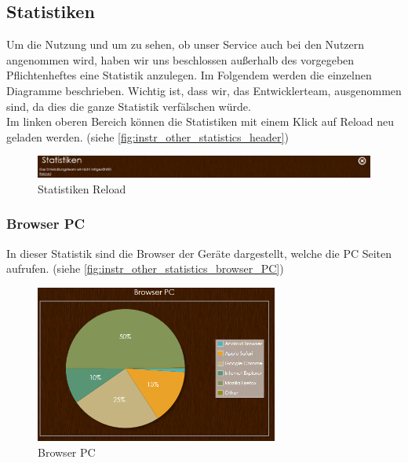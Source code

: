 \subsection{Statistiken}
Um die Nutzung und um zu sehen, ob unser Service auch bei den Nutzern angenommen wird, haben wir uns beschlossen außerhalb des vorgegeben Pflichtenheftes eine Statistik anzulegen. Im Folgendem werden die einzelnen Diagramme beschrieben. Wichtig ist, dass wir, das Entwicklerteam, ausgenommen sind, da dies die ganze Statistik verfälschen würde.\\
Im linken oberen Bereich können die Statistiken mit einem Klick auf Reload neu geladen werden. (siehe \autoref{fig:instr_other_statistics_header})
\begin{figure}[H]
\centering
\includegraphics[keepaspectratio=true, width=17cm]{images/screenshots/statistics_header.png}
\caption{Statistiken Reload}
\label{fig:instr_other_statistics_header}
\end{figure}
\subsubsection{Browser PC}
In dieser Statistik sind die Browser der Geräte dargestellt, welche die PC Seiten aufrufen. (siehe \autoref{fig:instr_other_statistics_browser_PC})
\begin{figure}[H]
\centering
\includegraphics[keepaspectratio=true, width=8cm]{images/screenshots/statistics_browser_PC.png}
\caption{Browser PC}
\label{fig:instr_other_statistics_browser_PC}
\end{figure}
